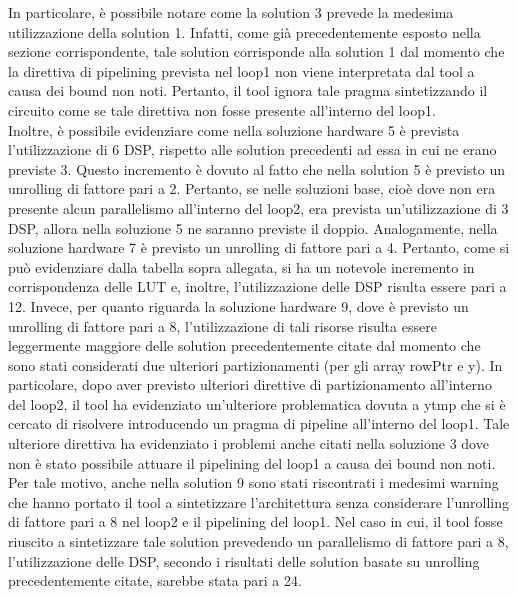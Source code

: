 In particolare, è possibile notare come la solution 3 prevede la medesima utilizzazione della solution 1. Infatti, come già precedentemente esposto nella sezione corrispondente, tale solution corrisponde alla solution 1 dal momento che la direttiva di pipelining prevista nel loop1 non viene interpretata dal tool a causa dei bound non noti. Pertanto, il tool ignora tale pragma sintetizzando il circuito come se tale direttiva non fosse presente all'interno del loop1. 
\\
Inoltre, è possibile evidenziare come nella soluzione hardware 5 è prevista l'utilizzazione di 6 DSP, rispetto alle solution precedenti ad essa in cui ne erano previste 3. Questo incremento è dovuto al fatto che nella solution 5 è previsto un unrolling di fattore pari a 2. Pertanto, se nelle soluzioni base, cioè dove non era presente alcun parallelismo all'interno del loop2, era prevista un'utilizzazione di 3 DSP, allora nella soluzione 5 ne saranno previste il doppio. Analogamente, nella soluzione hardware 7 è previsto un unrolling di fattore pari a 4. Pertanto, come si può evidenziare dalla tabella sopra allegata, si ha un notevole incremento in corrispondenza delle LUT e, inoltre, l'utilizzazione delle DSP risulta essere pari a 12. Invece, per quanto riguarda la soluzione hardware 9, dove è previsto un unrolling di fattore pari a 8, l'utilizzazione di tali risorse risulta essere leggermente maggiore delle solution precedentemente citate dal momento che sono stati considerati due ulteriori partizionamenti (per gli array rowPtr e y). In particolare, dopo aver previsto ulteriori direttive di partizionamento all'interno del loop2, il tool ha evidenziato un'ulteriore problematica dovuta a ytmp che si è cercato di risolvere introducendo un pragma di pipeline all'interno del loop1. Tale ulteriore direttiva ha evidenziato i problemi anche citati nella soluzione 3 dove non è stato possibile attuare il pipelining del loop1 a causa dei bound non noti. Per tale motivo, anche nella solution 9 sono stati riscontrati i medesimi warning che hanno portato il tool a sintetizzare l'architettura senza considerare l'unrolling di fattore pari a 8 nel loop2 e il pipelining del loop1. Nel caso in cui, il tool fosse riuscito a sintetizzare tale solution prevedendo un parallelismo di fattore pari a 8, l'utilizzazione delle DSP, secondo i risultati delle solution basate su unrolling precedentemente citate, sarebbe stata pari a 24.
\\

